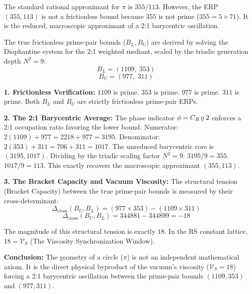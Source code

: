 \documentclass[11pt, letterpaper]{article}
\newcommand{\koppa}{\mathbin{\text{\rm\k{o}}}}
\newcommand{\Dcross}{\Delta_{\mathrm{cross}}}
\newcommand{\VS}{\mathcal{V}_S}
\begin{document}
\begin{theorem}\label{thm:pi_bounds}
\begin{rsbox}
The standard rational approximant for $\pi$ is $355/113$. However, the ERP $(355, 113)$ is not a frictionless bound because $355$ is not prime ($355 = 5 \times 71$). It is the reduced, macroscopic approximant of a 2:1 barycentric oscillation.

The true frictionless prime-pair bounds ($B_L, B_U$) are derived by solving the Diophantine system for the 2:1 weighted mediant, scaled by the triadic generation depth $N^2 = 9$:
\[ B_L = (1109,\; 353) \]
\[ B_U = (977,\; 311) \]

\textbf{1. Frictionless Verification:}
$1109$ is prime. $353$ is prime.
$977$ is prime. $311$ is prime.
Both $B_L$ and $B_U$ are strictly frictionless prime-pair ERPs.

\textbf{2. The 2:1 Barycentric Average:}
The phase indicator $\phi = C_R \koppa 2$ enforces a 2:1 occupation ratio favoring the lower bound.
Numerator: $2(1109) + 977 = 2218 + 977 = 3195$.
Denominator: $2(353) + 311 = 706 + 311 = 1017$.
The unreduced barycentric core is $(3195, 1017)$.
Dividing by the triadic scaling factor $N^2 = 9$:
$3195 / 9 = 355$.
$1017 / 9 = 113$.
This exactly recovers the macroscopic approximant $(355, 113)$.

\textbf{3. The Bracket Capacity and Vacuum Viscosity:}
The structural tension (Bracket Capacity) between the true prime-pair bounds is measured by their cross-determinant:
\[ \Dcross(B_U, B_L) = (977 \times 353) - (1109 \times 311) \]
\[ \Dcross(B_U, B_L) = 344881 - 344899 = -18 \]

The magnitude of this structural tension is exactly $18$.
In the RS constant lattice, $18 = \VS$ (The Viscosity Synchronization Window).

\textbf{Conclusion:}
The geometry of a circle ($\pi$) is not an independent mathematical axiom. It is the direct physical byproduct of the vacuum's viscosity ($\VS = 18$) forcing a 2:1 barycentric oscillation between the prime-pair bounds $(1109, 353)$ and $(977, 311)$.
\end{rsbox}
\end{theorem}
\end{document}
